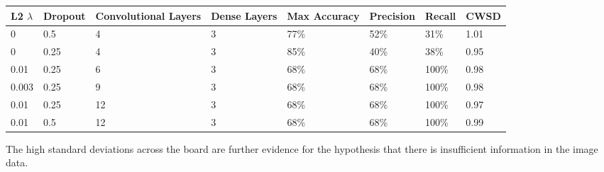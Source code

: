 \documentclass[10pt]{article}
\begin{document}
\begin{minipage}{\textwidth}
    \begin{center}
        \begin{tabular}{|l|l|l|l|l|l|l|l|}
            \hline
            L2 $\lambda$ & Dropout & Convolutional Layers & Dense Layers & Max Accuracy & Precision & Recall & CWSD \\
            \hline
            0 & 0.5 & 4 & 3 & 77\% & 52\% & 31\% & 1.01 \\
            \hline
            0 & 0.25 & 4 & 3 & 85\% & 40\% & 38\% & 0.95 \\
            \hline
            0.01 & 0.25 & 6 & 3 & 68\% & 68\% & 100\% & 0.98 \\
            \hline
            0.003 & 0.25 & 9 & 3 & 68\% & 68\% & 100\% & 0.98 \\
            \hline
            0.01 & 0.25 & 12 & 3 & 68\% & 68\% & 100\% & 0.97 \\
            \hline
            0.01 & 0.5 & 12 & 3 & 68\% & 68\% & 100\% & 0.99 \\
            \hline
        \end{tabular}
    \end{center}
\end{minipage}

The high standard deviations across the board are further evidence for the hypothesis that there is insufficient information in the image data.
\end{document}
